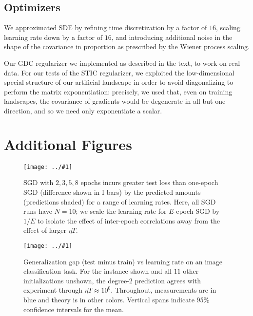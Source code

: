 \documentclass{article}
\theoremstyle{plain}
\theoremstyle{definition}
\newcommand{\plotmoow}[3]{\texttt{[image: ../\#1]}}
\begin{document}
    \subsection{Optimizers}
        We approximated SDE by refining time discretization by a factor of
        $16$, scaling learning rate down by a factor of $16$, and introducing
        additional noise in the shape of the covariance in proportion as
        prescribed by the Wiener process scaling.

        Our GDC regularizer we implemented as described in the text, to work
        on real data.  For our tests of the STIC regularizer, we exploited the
        low-dimensional special structure of our artificial landscape in order
        to avoid diagonalizing to perform the matrix exponentiation: precisely,
        we used that, even on training landscapes, the covariance of gradients
        would be degenerate in all but one direction, and so we need only 
        exponentiate a scalar.

\section{Additional Figures}\label{sect:figures}

    \begin{figure}[h]
        \centering
        \plotmoow{plots/multi-fashion-logistic-0}{0.98\columnwidth}{4.0cm}
        \caption{
            SGD with $2, 3, 5, 8$ epochs incurs greater test
            loss than one-epoch SGD (difference shown in I bars) by the
            predicted amounts (predictions shaded) for a range of learning
            rates.  Here, all SGD runs have $N=10$; we scale the learning rate
            for $E$-epoch SGD by $1/E$ to isolate the effect of inter-epoch
            correlations away from the effect of larger $\eta T$.
        }
        \label{fig:multi}
    \end{figure}

    \begin{figure}[h]
        \centering
        \plotmoow{plots/gen-cifar}{0.98\columnwidth}{3.0cm}
        \caption{
            Generalization gap (test minus train) vs learning rate on an
            image classification task.  For the instance shown and all $11$
            other initializations unshown, the degree-$2$ prediction agrees
            with experiment through $\eta T \approx 10^0$.  Throughout,
            measurements are in blue and theory is in other colors.
            Vertical spans indicate 95\% confidence intervals for the mean.
        }
        \label{fig:gen}
    \end{figure}
\end{document}
